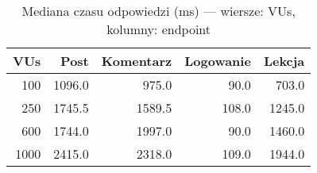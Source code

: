 \begin{table}[H]
\centering
\caption{Mediana czasu odpowiedzi (ms) — wiersze: VUs, kolumny: endpoint}
\label{tab:mediana-vs-vus}
\begin{tabular}{rrrrr}
\toprule
 VUs &   Post &  Komentarz &  Logowanie &  Lekcja \\
\midrule
 100 & 1096.0 &      975.0 &       90.0 &   703.0 \\
 250 & 1745.5 &     1589.5 &      108.0 &  1245.0 \\
 600 & 1744.0 &     1997.0 &       90.0 &  1460.0 \\
1000 & 2415.0 &     2318.0 &      109.0 &  1944.0 \\
\bottomrule
\end{tabular}
\end{table}
